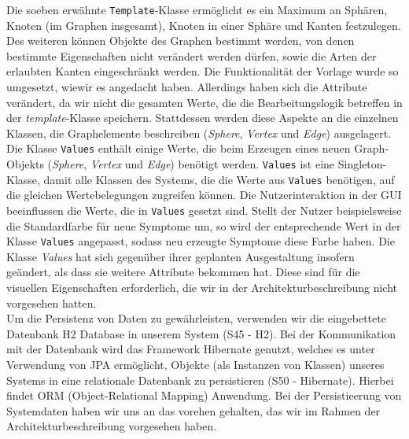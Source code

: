 \documentclass[enabledeprecatedfontcommands,fontsize=11pt,paper=a4,twoside]{scrartcl}
\begin{document}
Die soeben erwähnte \texttt{Template}-Klasse ermöglicht es ein Maximum an Sphären, Knoten (im Graphen insgesamt), Knoten in einer Sphäre und Kanten festzulegen. Des weiteren können Objekte des Graphen bestimmt werden, von denen bestimmte Eigenschaften nicht verändert werden dürfen, sowie die Arten der erlaubten Kanten eingeschränkt werden. Die Funktionalität der Vorlage wurde so umgesetzt, wiewir es angedacht haben. Allerdings haben sich die Attribute verändert, da wir nicht die gesamten Werte, die die Bearbeitungslogik betreffen in der \textit{template}-Klasse speichern. Stattdessen werden diese Aspekte an die einzelnen Klassen, die Graphelemente beschreiben (\textit{Sphere}, \textit{Vertex} und \textit{Edge}) ausgelagert. \\

Die Klasse \texttt{Values} enthält einige Werte, die beim Erzeugen eines neuen Graph-Objekts (\textit{Sphere}, \textit{Vertex} und \textit{Edge}) benötigt werden. \texttt{Values} ist eine Singleton-Klasse, damit alle Klassen des Systems, die die Werte aus \texttt{Values} benötigen, auf die gleichen Wertebelegungen zugreifen können. Die Nutzerinteraktion in der GUI beeinflussen die Werte, die in \texttt{Values} gesetzt sind. Stellt der Nutzer beispielsweise die Standardfarbe für neue Symptome um, so wird der entsprechende Wert in der Klasse \texttt{Values} angepasst, sodass neu erzeugte Symptome diese Farbe haben. Die Klasse \textit{Values} hat sich gegenüber ihrer geplanten Ausgestaltung insofern geändert, als dass sie weitere Attribute bekommen hat. Diese sind für die visuellen Eigenschaften erforderlich, die wir in der Architekturbeschreibung nicht vorgesehen hatten.\\

Um die Persistenz von Daten zu gewährleisten, verwenden wir die eingebettete Datenbank H2 Database in unserem System (S45 - H2). Bei der Kommunikation mit der Datenbank wird das Framework Hibernate genutzt, welches es unter Verwendung von JPA ermöglicht, Objekte (als Instanzen von Klassen) unseres Systems in eine relationale Datenbank zu persistieren (S50 - Hibernate). Hierbei findet ORM (Object-Relational Mapping) Anwendung. Bei der Persistieerung von Systemdaten haben wir uns an das vorehen gehalten, das wir im Rahmen der Architekturbeschreibung vorgesehen haben.\\ 
\end{document}
